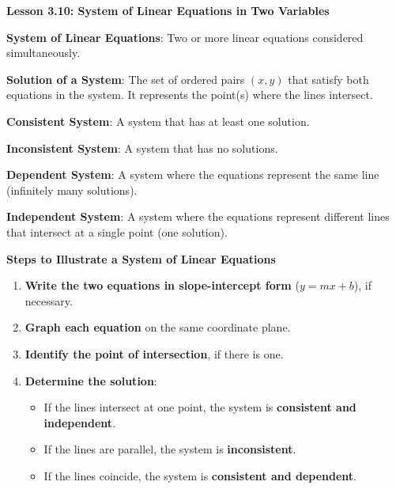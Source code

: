  \begin{center}
\textbf{Lesson 3.10: System of Linear Equations in Two Variables}
\end{center}

\vspace*{-2ex}

    \noindent \textbf{System of Linear Equations}: Two or more linear equations considered simultaneously.

    \noindent \textbf{Solution of a System}: The set of ordered pairs $(x, y)$ that satisfy both equations in the system. It represents the point(s) where the lines intersect.

    \noindent \textbf{Consistent System}: A system that has at least one solution.

    \noindent \textbf{Inconsistent System}: A system that has no solutions.

    \noindent \textbf{Dependent System}: A system where the equations represent the same line (infinitely many solutions).

    \noindent \textbf{Independent System}: A system where the equations represent different lines that intersect at a single point (one solution).


\noindent\textbf{Steps to Illustrate a System of Linear Equations}

\begin{enumerate}
    \item \textbf{Write the two equations in slope-intercept form} ($y = mx + b$), if necessary.
    \item \textbf{Graph each equation} on the same coordinate plane.
    \item \textbf{Identify the point of intersection}, if there is one.
    \item \textbf{Determine the solution}: 
    \begin{itemize}
        \item If the lines intersect at one point, the system is \textbf{consistent and independent}.
        \item If the lines are parallel, the system is \textbf{inconsistent}.
        \item If the lines coincide, the system is \textbf{consistent and dependent}.
    \end{itemize}
\end{enumerate}

